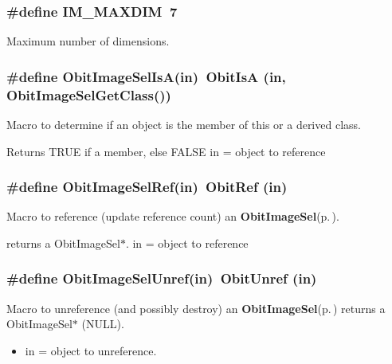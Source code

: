\subsubsection{\setlength{\rightskip}{0pt plus 5cm}\#define IM\_\-MAXDIM\ 7}\label{ObitImageSel_8h_a3}


Maximum number of dimensions. 

\subsubsection{\setlength{\rightskip}{0pt plus 5cm}\#define Obit\-Image\-Sel\-Is\-A(in)\ Obit\-Is\-A (in, Obit\-Image\-Sel\-Get\-Class())}\label{ObitImageSel_8h_a2}


Macro to determine if an object is the member of this or a derived class. 

Returns TRUE if a member, else FALSE in = object to reference 
\subsubsection{\setlength{\rightskip}{0pt plus 5cm}\#define Obit\-Image\-Sel\-Ref(in)\ Obit\-Ref (in)}\label{ObitImageSel_8h_a1}


Macro to reference (update reference count) an {\bf Obit\-Image\-Sel}{\rm (p.\,\pageref{structObitImageSel})}. 

returns a Obit\-Image\-Sel$\ast$. in = object to reference 
\subsubsection{\setlength{\rightskip}{0pt plus 5cm}\#define Obit\-Image\-Sel\-Unref(in)\ Obit\-Unref (in)}\label{ObitImageSel_8h_a0}


Macro to unreference (and possibly destroy) an {\bf Obit\-Image\-Sel}{\rm (p.\,\pageref{structObitImageSel})} returns a Obit\-Image\-Sel$\ast$ (NULL). 

\begin{itemize}
\item in = object to unreference. \end{itemize}


